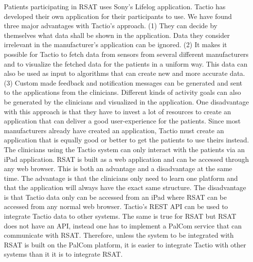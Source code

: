 \documentclass{cslthse-msc}
\begin{document}
Patients participating in RSAT uses Sony’s Lifelog application. Tactio has developed their own application for their participants to use. We have found three major advantages with Tactio’s approach. (1) They can decide by themselves what data shall be shown in the application. Data they consider irrelevant in the manufacturer’s application can be ignored. (2) It makes it possible for Tactio to fetch data from sensors from several different manufacturers and to visualize the fetched data for the patients in a uniform way. This data can also be used as input to algorithms that can create new and more accurate data. (3) Custom made feedback and notification messages can be generated and sent to the applications from the clinicians. Different kinds of activity goals can also be generated by the clinicians and visualized in the application. One disadvantage with this approach is that they have to invest a lot of resources to create an application that can deliver a good user-experience for the patients. Since most manufacturers already have created an application, Tactio must create an application that is equally good or better to get the patients to use theirs instead.
The clinicians using the Tactio system can only interact with the patients via an iPad application. RSAT is built as a web application and can be accessed through any web browser. This is both an advantage and a disadvantage at the same time. The advantage is that the clinicians only need to learn one platform and that the application will always have the exact same structure. The disadvantage is that Tactio data only can be accessed from an iPad where RSAT can be accessed from any normal web browser.
Tactio’s REST API can be used to integrate Tactio data to other systems. The same is true for RSAT but RSAT does not have an API, instead one has to implement a PalCom service that can communicate with RSAT. Therefore, unless the system to be integrated with RSAT is built on the PalCom platform, it is easier to integrate Tactio with other systems than it it is to integrate RSAT. 

\end{document}
